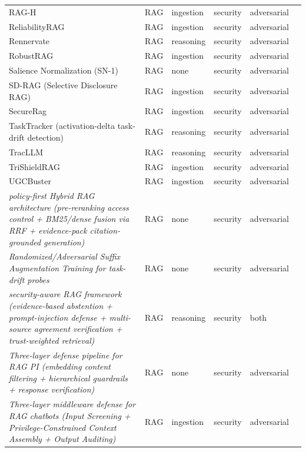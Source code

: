 \begin{longtable}{@{}>{\raggedright\arraybackslash}p{}lllll@{}}
RAG-H & RAG & ingestion & security & adversarial & \cite{ceraku-2026-ragh} \\
ReliabilityRAG & RAG & ingestion & security & adversarial & \cite{shen-2025-reliabilityrag} \\
Rennervate & RAG & reasoning & security & adversarial & \cite{zhong-2025-attention} \\
RobustRAG & RAG & ingestion & security & adversarial & \cite{xiang-2024-certifiably} \\
Salience Normalization (SN-1) & RAG & none & security & adversarial & \cite{zhou-2026-salience} \\
SD-RAG (Selective Disclosure RAG) & RAG & ingestion & security & adversarial & \cite{masoud-2026-sdrag} \\
SecureRag & RAG & ingestion & security & adversarial & \cite{mishra-2025-securerag} \\
TaskTracker (activation-delta task-drift detection) & RAG & reasoning & security & adversarial & \cite{abdelnabi-2024-get} \\
TracLLM & RAG & reasoning & security & adversarial & \cite{wang-2025-tracllm} \\
TriShieldRAG & RAG & ingestion & security & adversarial & \cite{mohanty-2026-trishieldrag} \\
UGCBuster & RAG & ingestion & security & adversarial & \cite{kaya-2025-meets} \\
\emph{policy-first Hybrid RAG architecture (pre-reranking access control + BM25/dense fusion via RRF + evidence-pack citation-grounded generation)} & RAG & none & security & adversarial & \cite{gudipuri-2026-enterprise} \\
\emph{Randomized/Adversarial Suffix Augmentation Training for task-drift probes} & RAG & none & security & adversarial & \cite{rahman-2026-bypassing} \\
\emph{security-aware RAG framework (evidence-based abstention + prompt-injection defense + multi-source agreement verification + trust-weighted retrieval)} & RAG & reasoning & security & both & \cite{kolavennu-2026-securityaware} \\
\emph{Three-layer defense pipeline for RAG PI (embedding content filtering + hierarchical guardrails + response verification)} & RAG & none & security & adversarial & \cite{ramakrishnan-2025-securing} \\
\emph{Three-layer middleware defense for RAG chatbots (Input Screening + Privilege-Constrained Context Assembly + Output Auditing)} & RAG & ingestion & security & adversarial & \cite{saleem-2026-layered} \\

\end{longtable}
